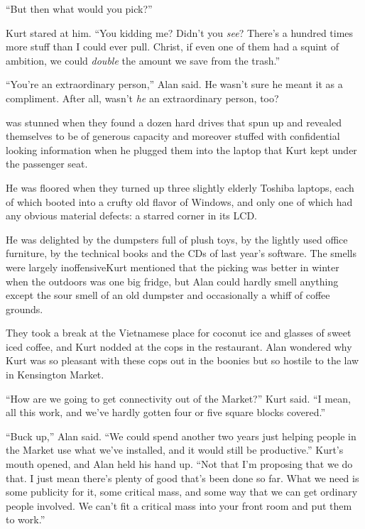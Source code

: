 ``But then what would you pick?''

Kurt stared at him.  ``You kidding me?  Didn't you \textit{see}? 
There's a hundred times more stuff than I could ever pull.  Christ, if
even one of them had a squint of ambition, we could \textit{double}
the amount we save from the trash.''

``You're an extraordinary person,'' Alan said.  He wasn't sure he
meant it as a compliment.  After all, wasn't \textit{he} an
extraordinary person, too?

 was stunned when they found a dozen hard drives that spun up and
revealed themselves to be of generous capacity and moreover stuffed
with confidential looking information when he plugged them into the
laptop that Kurt kept under the passenger seat.

He was floored when they turned up three slightly elderly Toshiba
laptops, each of which booted into a crufty old flavor of Windows, and
only one of which had any obvious material defects:  a starred corner
in its LCD.

He was delighted by the dumpsters full of plush toys, by the lightly
used office furniture, by the technical books and the CDs of last
year's software.  The smells were largely inoffensive\dash{}Kurt mentioned
that the picking was better in winter when the outdoors was one big
fridge, but Alan could hardly smell anything except the sour smell of
an old dumpster and occasionally a whiff of coffee grounds.

They took a break at the Vietnamese place for coconut ice and glasses
of sweet iced coffee, and Kurt nodded at the cops in the restaurant. 
Alan wondered why Kurt was so pleasant with these cops out in the
boonies but so hostile to the law in Kensington Market.

``How are we going to get connectivity out of the Market?'' Kurt said. 
``I mean, all this work, and we've hardly gotten four or five square
blocks covered.''

``Buck up,'' Alan said.  ``We could spend another two years just
helping people in the Market use what we've installed, and it would
still be productive.'' Kurt's mouth opened, and Alan held his hand up. 
``Not that I'm proposing that we do that.  I just mean there's plenty
of good that's been done so far.  What we need is some publicity for
it, some critical mass, and some way that we can get ordinary people
involved.  We can't fit a critical mass into your front room and put
them to work.''

